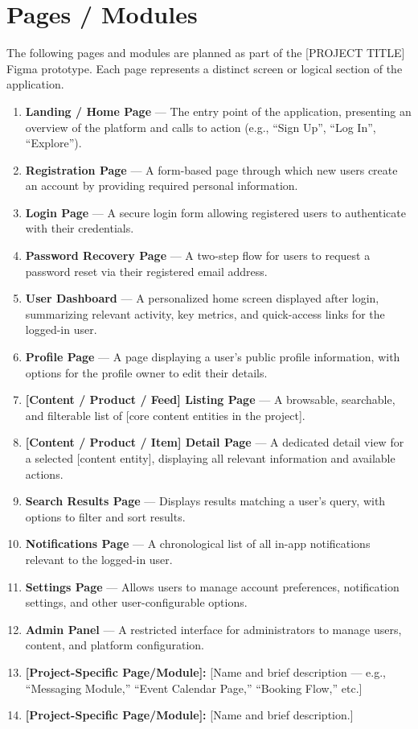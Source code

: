 \documentclass[12pt, a4paper]{article}
\begin{document}
\section{Pages / Modules}

The following pages and modules are planned as part of the [PROJECT TITLE] Figma prototype. Each page represents a distinct screen or logical section of the application.

\begin{enumerate}
    \item \textbf{Landing / Home Page} --- The entry point of the application, presenting an overview of the platform and calls to action (e.g., ``Sign Up'', ``Log In'', ``Explore'').
    \item \textbf{Registration Page} --- A form-based page through which new users create an account by providing required personal information.
    \item \textbf{Login Page} --- A secure login form allowing registered users to authenticate with their credentials.
    \item \textbf{Password Recovery Page} --- A two-step flow for users to request a password reset via their registered email address.
    \item \textbf{User Dashboard} --- A personalized home screen displayed after login, summarizing relevant activity, key metrics, and quick-access links for the logged-in user.
    \item \textbf{Profile Page} --- A page displaying a user's public profile information, with options for the profile owner to edit their details.
    \item \textbf{[Content / Product / Feed] Listing Page} --- A browsable, searchable, and filterable list of [core content entities in the project].
    \item \textbf{[Content / Product / Item] Detail Page} --- A dedicated detail view for a selected [content entity], displaying all relevant information and available actions.
    \item \textbf{Search Results Page} --- Displays results matching a user's query, with options to filter and sort results.
    \item \textbf{Notifications Page} --- A chronological list of all in-app notifications relevant to the logged-in user.
    \item \textbf{Settings Page} --- Allows users to manage account preferences, notification settings, and other user-configurable options.
    \item \textbf{Admin Panel} --- A restricted interface for administrators to manage users, content, and platform configuration.
    \item \textbf{[Project-Specific Page/Module]:} [Name and brief description --- e.g., ``Messaging Module,'' ``Event Calendar Page,'' ``Booking Flow,'' etc.]
    \item \textbf{[Project-Specific Page/Module]:} [Name and brief description.]
\end{enumerate}
\end{document}
